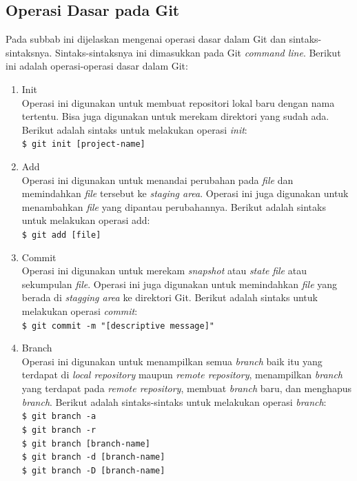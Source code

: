 \subsection{Operasi Dasar pada Git}
\label{subsec:operasi_dasar_git}
Pada subbab ini dijelaskan mengenai operasi dasar dalam Git dan sintaks-sintaksnya. Sintaks-sintaksnya ini dimasukkan pada Git \textit{command line}. Berikut ini adalah operasi-operasi dasar dalam Git:
\begin{enumerate}
\item Init\\
Operasi ini digunakan untuk membuat repositori lokal baru dengan nama tertentu. Bisa juga digunakan untuk merekam direktori yang sudah ada. Berikut adalah sintaks untuk melakukan operasi  \textit{init}:\\
\texttt{\$ git init [project-name]}  
\item Add\\
Operasi ini digunakan untuk menandai perubahan pada \textit{file} dan memindahkan \textit{file} tersebut ke \textit{staging area}. Operasi ini juga digunakan untuk menambahkan \textit{file} yang dipantau perubahannya. Berikut adalah sintaks untuk melakukan operasi add:\\
\texttt{\$ git add [file]}  
\item Commit\\
Operasi ini digunakan untuk merekam \textit{snapshot} atau \textit{state} \textit{file} atau sekumpulan \textit{file}. Operasi ini juga digunakan untuk memindahkan \textit{file} yang berada di \textit{stagging area} ke direktori Git. Berikut adalah sintaks untuk melakukan operasi \textit{commit}:\\
\texttt{\$ git commit -m "[descriptive message]"}  
\item Branch\\
Operasi ini digunakan untuk menampilkan semua \textit{branch} baik itu yang terdapat di \textit{local repository} maupun \textit{remote repository}, menampilkan \textit{branch} yang terdapat pada \textit{remote repository}, membuat \textit{branch} baru, dan menghapus \textit{branch}. Berikut adalah sintaks-sintaks untuk melakukan operasi \textit{branch}:\\
\texttt{\$ git branch -a}\\ 
\texttt{\$ git branch -r}\\
\texttt{\$ git branch [branch-name]}\\
\texttt{\$ git branch -d [branch-name]}\\
\texttt{\$ git branch -D [branch-name]} 

\end{enumerate}
